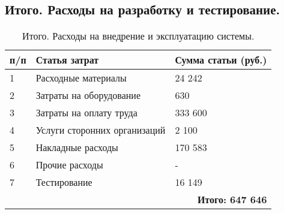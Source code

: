 \subsection{Итого. Расходы на разработку  и тестирование.}
\begin{table}[tb!h]
	\caption{Итого. Расходы на внедрение и эксплуатацию системы.}
    \centering
        \begin{tabular}{|l|l|l|}
        		\hline
        		\textnumero п/п & Статья затрат & Сумма статьи (руб.) \\
        		\hline
        		1 & Расходные материалы & 24 242 \\
        		\hline
        		2  & Затраты на оборудование & 630 \\
        		\hline
        		3  & Затраты на оплату труда & 333 600 \\
        		\hline
        		4  & Услуги сторонних организаций & 2 100 \\
        		\hline
        		5  &  Накладные расходы & 170 583 \\
        		\hline
        		6 & Прочие расходы & - \\
        		\hline
        		7 & Тестирование & 16 149 \\
        		\hline
			\multicolumn{3}{|r|}{\textbf{Итого: 647 646} }\\
			\hline
        \end{tabular}   		
\end{table}